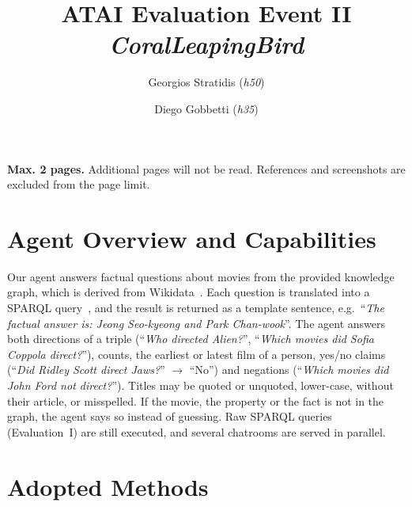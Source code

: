 \documentclass{article}
\begin{document}
\title{ATAI Evaluation Event II\\[0.3em]
\large \textit{CoralLeapingBird}}

\author{
Georgios Stratidis (\textit{h50})
\and
Diego Gobbetti (\textit{h35})
}

\date{}

\maketitle
\noindent
\textbf{Max. 2 pages.} Additional pages will not be read.
References and screenshots are excluded from the page limit.

\section{Agent Overview and Capabilities}

Our agent answers factual questions about movies from the provided knowledge graph, which is derived from Wikidata~\cite{vrandecic2014wikidata}. Each question is translated into a SPARQL query~\cite{harris2013sparql}, and the result is returned as a template sentence, e.g.\ ``\textit{The factual answer is: Jeong Seo-kyeong and Park Chan-wook}''. The agent answers both directions of a triple (``\textit{Who directed Alien?}'', ``\textit{Which movies did Sofia Coppola direct?}''), counts, the earliest or latest film of a person, yes/no claims (``\textit{Did Ridley Scott direct Jaws?}'' $\rightarrow$ ``No'') and negations (``\textit{Which movies did John Ford not direct?}''). Titles may be quoted or unquoted, lower-case, without their article, or misspelled. If the movie, the property or the fact is not in the graph, the agent says so instead of guessing. Raw SPARQL queries (Evaluation~I) are still executed, and several chatrooms are served in parallel.

\section{Adopted Methods}
\end{document}
